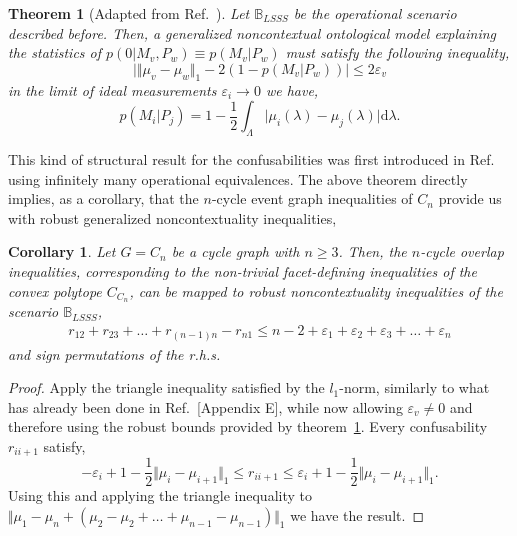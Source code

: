 \documentclass[letterpaper,onecolumn,12pt,accepted=2024-01-17]{article}
\newtheorem{theorem}{Theorem}
\newtheorem{corollary}{Corollary}
\begin{document}
\begin{theorem}[Adapted from Ref.~\cite{Lostaglio2020contextualadvantage}]\label{theorem: lostagio_senno}
Let $\mathbb{B}_{LSSS}$ be the operational scenario described before. Then, a generalized noncontextual ontological model explaining the statistics of $p(0\vert M_v,P_w) \equiv p(M_v\vert P_w)$ must satisfy the following inequality,
\begin{equation}
    \vert \Vert \mu_v - \mu_w \Vert_1 - 2(1-p(M_v \vert P_w)) \vert \leq 2\varepsilon_v 
\end{equation}
in the limit of ideal measurements $\varepsilon_i \to 0$ we have,
\begin{equation}
    p(M_i \vert P_j) = 1 - \frac{1}{2}\int_\Lambda \vert \mu_i(\lambda) - \mu_j(\lambda)\vert \mathrm{d}\lambda.
\end{equation}
\end{theorem}

This kind of structural result for the confusabilities was first introduced in Ref.~\cite{schmid2018discrimination} using infinitely many operational equivalences. The above theorem directly implies, as a corollary, that the $n$-cycle event graph inequalities of $C_n$ provide us with robust generalized noncontextuality inequalities, 
 

\begin{corollary}
{Let $G=C_n$ be a cycle graph with $n\geq 3$. Then, the $n$-cycle overlap inequalities, corresponding to the non-trivial facet-defining inequalities of the convex polytope $C_{C_n}$, can be mapped to robust noncontextuality inequalities of the scenario $\mathbb{B}_{LSSS}$,}
\begin{align*}
    r_{12}+r_{23}+\dots+r_{(n-1)n}-r_{n1} \leq n-2 + \varepsilon_1+\varepsilon_2+\varepsilon_3+\dots+\varepsilon_n
\end{align*}
and sign permutations of the r.h.s. 
\end{corollary}

\begin{proof}
Apply the triangle inequality satisfied by the $l_1$-norm, similarly to what has already been done in Ref.~[Appendix E]\cite{wagner2022inequalities}, while now allowing $\varepsilon_v \neq 0$ and therefore using the robust bounds provided by theorem~\ref{theorem: lostagio_senno}. Every confusability $r_{ii+1}$ satisfy,
\begin{equation*}
    -\varepsilon_i+1-\frac{1}{2} \Vert \mu_i - \mu_{i+1}  \Vert_1 \leq r_{ii+1}\leq \varepsilon_i + 1 - \frac{1}{2}\Vert \mu_i - \mu_{i+1}  \Vert_1.
\end{equation*}
Using this and applying the triangle inequality to $\Vert \mu_1 - \mu_n + (\mu_2-\mu_2+\dots+\mu_{n-1}-\mu_{n-1})\Vert_1$ we have the result.
\end{proof}
\end{document}

